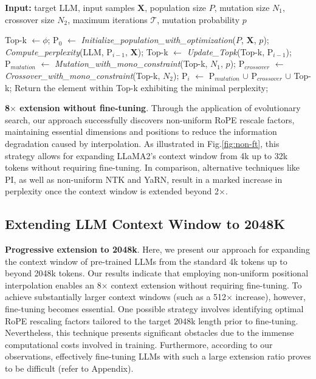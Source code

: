 \begin{algorithm}[t]
	\small
	\caption{The search algorithm}
	\textbf{Input:} target LLM, input samples $\mathbf{X}$, population size $P$, mutation size $N_1$, crossover size $N_2$, maximum iterations $\mathcal{T}$, mutation probability $p$\\

	\begin{algorithmic}[1]
		\label{alg:search}
		\STATE Top-k $\leftarrow \phi$;
		\STATE $\text{P}_0$ $\leftarrow$ \textit{Initialize\_population\_with\_optimization}($P$, $\mathbf{X}$, $p$); 
		\STATE \textit{Compute\_perplexity}(LLM, $\text{P}_{i-1}$, $\mathbf{X}$);
		\STATE Top-k $\leftarrow$ \textit{Update\_Topk}(Top-k, $\text{P}_{i-1}$);
		\STATE $\text{P}_{mutation}$ $\leftarrow$ \textit{Mutation\_with\_mono\_constraint}(Top-k, $N_1$, $p$);
		\STATE $\text{P}_{crossover}$ $\leftarrow$ \textit{Crossover\_with\_mono\_constraint}(Top-k, $N_2$);
		\STATE $\text{P}_i$ $\leftarrow$ $\text{P}_{mutation}$ $\cup$ $\text{P}_{crossover}$ $\cup$ Top-k;
		\ENDFOR
		\STATE Return the element within Top-k exhibiting the minimal perplexity;
	\end{algorithmic}
\end{algorithm}

\textbf{8$\times$ extension without fine-tuning}. Through the application of evolutionary search, our approach successfully discovers non-uniform RoPE rescale factors, maintaining essential dimensions and positions to reduce the information degradation caused by interpolation. As illustrated in Fig.\ref{fig:non-ft}, this strategy allows for expanding LLaMA2’s context window from 4k up to 32k tokens without requiring fine-tuning. In comparison, alternative techniques like PI, as well as non-uniform NTK and YaRN, result in a marked increase in perplexity once the context window is extended beyond 2$\times$.

\subsection{Extending LLM Context Window to 2048K}
\label{sec:extendto2048k}

\textbf{Progressive extension to 2048k}. Here, we present our approach for expanding the context window of pre-trained LLMs from the standard 4k tokens up to beyond 2048k tokens. Our results indicate that employing non-uniform positional interpolation enables an 8$\times$ context extension without requiring fine-tuning. To achieve substantially larger context windows (such as a 512$\times$ increase), however, fine-tuning becomes essential. One possible strategy involves identifying optimal RoPE rescaling factors tailored to the target 2048k length prior to fine-tuning. Nevertheless, this technique presents significant obstacles due to the immense computational costs involved in training. Furthermore, according to our observations, effectively fine-tuning LLMs with such a large extension ratio proves to be difficult (refer to Appendix).

